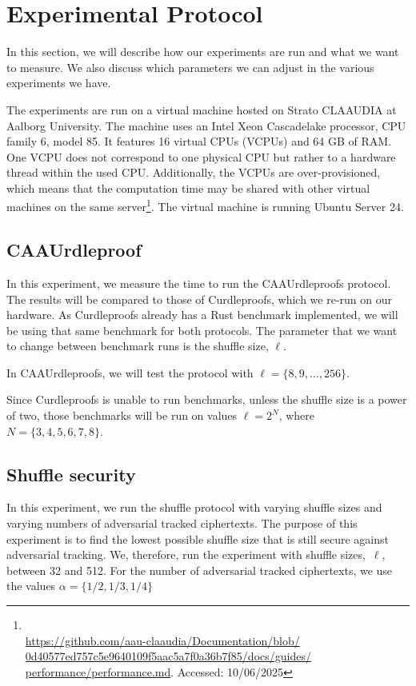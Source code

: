 
\section{Experimental Protocol}\label{sec:experimental-protocol}
In this section, we will describe how our experiments are run and what we want to measure.
We also discuss which parameters we can adjust in the various experiments we have.

The experiments are run on a virtual machine hosted on Strato CLAAUDIA at Aalborg University.
The machine uses an Intel Xeon Cascadelake processor, CPU family 6, model 85.
It features 16 virtual CPUs (VCPUs) and 64 GB of RAM\@.
One VCPU does not correspond to one physical CPU but rather to a hardware thread within the used CPU\@.
Additionally, the VCPUs are over-provisioned, which means that the computation time may be shared with other virtual machines on the same server\footnote{\\ \href{https://github.com/aau-claaudia/Documentation/blob/0d40577ed757c5e9640109f5aac5a7f0a36b7f85/docs/guides/performance/performance.md}{https://github.com/aau-claaudia/Documentation/blob/\\0d40577ed757c5e9640109f5aac5a7f0a36b7f85/docs/guides/\\performance/performance.md}. Accessed: 10/06/2025}.
The virtual machine is running Ubuntu Server 24.


\subsection{CAAUrdleproof}\label{sec:CAAUrdleproof-experiment}
In this experiment, we measure the time to run the CAAUrdleproofs protocol.
The results will be compared to those of Curdleproofs, which we re-run on our hardware.
As Curdleproofs already has a Rust benchmark implemented, we will be using that same benchmark for both protocols.
The parameter that we want to change between benchmark runs is the shuffle size, $\ell$.

In CAAUrdleproofs, we will test the protocol with $\ell=\{8,9,\dots,256\}$.

Since Curdleproofs is unable to run benchmarks, unless the shuffle size is a power of two, those benchmarks will be run on values $\ell=2^N$, where $N=\{3,4,5,6,7,8\}$.




\subsection{Shuffle security}\label{subsec:experimental-protocol-shuffle-security}
In this experiment, we run the shuffle protocol with varying shuffle sizes and varying numbers of adversarial tracked ciphertexts.
The purpose of this experiment is to find the lowest possible shuffle size that is still secure against adversarial tracking.
We, therefore, run the experiment with shuffle sizes,~$\ell$, between 32 and 512.
For the number of adversarial tracked ciphertexts, we use the values $\alpha=\{1/2,1/3,1/4\}$

